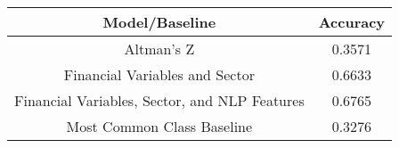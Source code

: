 \footnotesize
\begin{tabular}{cc}
\toprule
Model/Baseline & Accuracy \\
\midrule
Altman's Z & 0.3571 \\
Financial Variables and Sector & 0.6633 \\
Financial Variables, Sector, and NLP Features & 0.6765 \\
Most Common Class Baseline & 0.3276 \\
\bottomrule
\end{tabular}

\normalsize